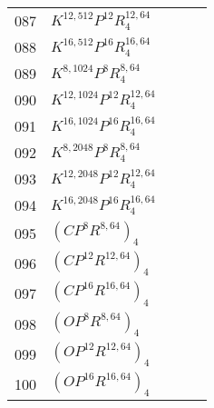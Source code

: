 \begin{appendices}
\begin{table*}
\begin{tabular}{|l | l | l | l }
		087&$K^{12,512}P^{12}R^{12,64}_4$ &~&~\\
		088&$K^{16,512}P^{16}R^{16,64}_4$ &~&~\\
		089&$K^{8,1024}P^{8}R^{8,64}_4$ &~&~\\
		090&$K^{12,1024}P^{12}R^{12,64}_4$ &~&~\\
		091&$K^{16,1024}P^{16}R^{16,64}_4$ &~&~\\
		092&$K^{8,2048}P^{8}R^{8,64}_4$ &~&~\\
		093&$K^{12,2048}P^{12}R^{12,64}_4$ &~&~\\
		094&$K^{16,2048}P^{16}R^{16,64}_4$ &~&~\\
		095&$(CP^8R^{8,64})_4$ &~&~\\
		096&$(CP^{12}R^{12,64})_4$ &~&~\\
		097&$(CP^{16}R^{16,64})_4$ &~&~\\
		098&$(OP^8R^{8,64})_4$ &~&~\\
		099&$(OP^{12}R^{12,64})_4$ &~&~\\
		100&$(OP^{16}R^{16,64})_4$ &~&~\\


\end{tabular}
\end{table*}
\end{appendices}
